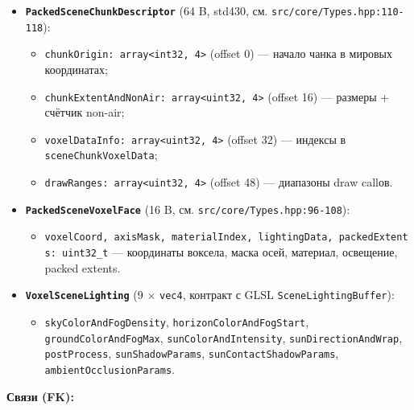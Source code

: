 \documentclass[
  11pt,a4paper,oneside]{article}
\providecommand{\tightlist}{%
  \setlength{\itemsep}{0pt}\setlength{\parskip}{0pt}}
\providecommand{\tightlist}{%
  \setlength{\itemsep}{0pt}\setlength{\parskip}{0pt}}
\begin{document}
\begin{itemize}
\tightlist
\item
  \textbf{\texttt{PackedSceneChunkDescriptor}} (64 B, std430, см. \texttt{src/core/Types.hpp:110-118}):

  \begin{itemize}
  \tightlist
  \item
    \texttt{chunkOrigin:\ array\textless{}int32,\ 4\textgreater{}} (offset 0) --- начало чанка в мировых координатах;
  \item
    \texttt{chunkExtentAndNonAir:\ array\textless{}uint32,\ 4\textgreater{}} (offset 16) --- размеры + счётчик non-air;
  \item
    \texttt{voxelDataInfo:\ array\textless{}uint32,\ 4\textgreater{}} (offset 32) --- индексы в \texttt{sceneChunkVoxelData};
  \item
    \texttt{drawRanges:\ array\textless{}uint32,\ 4\textgreater{}} (offset 48) --- диапазоны draw call\textquotesingle ов.
  \end{itemize}
\item
  \textbf{\texttt{PackedSceneVoxelFace}} (16 B, см. \texttt{src/core/Types.hpp:96-108}):

  \begin{itemize}
  \tightlist
  \item
    \texttt{voxelCoord,\ axisMask,\ materialIndex,\ lightingData,\ packedExtents:\ uint32\_t} --- координаты воксела, маска осей, материал, освещение, packed extents.
  \end{itemize}
\item
  \textbf{\texttt{VoxelSceneLighting}} (9 × \texttt{vec4}, контракт с GLSL \texttt{SceneLightingBuffer}):

  \begin{itemize}
  \tightlist
  \item
    \texttt{skyColorAndFogDensity}, \texttt{horizonColorAndFogStart}, \texttt{groundColorAndFogMax}, \texttt{sunColorAndIntensity}, \texttt{sunDirectionAndWrap}, \texttt{postProcess}, \texttt{sunShadowParams}, \texttt{sunContactShadowParams}, \texttt{ambientOcclusionParams}.
  \end{itemize}
\end{itemize}

\textbf{Связи (FK):}
\end{document}
